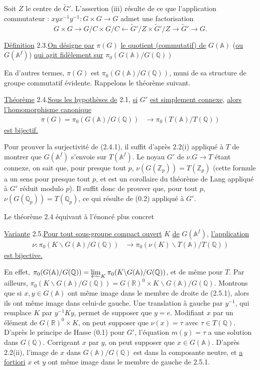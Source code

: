 \documentclass[10pt]{article}
\newcommand{\A}{\mathbb A}
\newcommand{\Af}{\mathbb A^f}
\newcommand{\Q}{\mathbb Q}
\newcommand{\R}{\mathbb R}
\newcommand{\Z}{\mathbb Z}
\newcommand{\limproj}{\varprojlim}
\begin{document}
Soit $Z$ le centre de $\widetilde G'$. L'assertion (iii) résulte de ce que l'application \textquotedbl{}commutateur\textquotedbl{} : $xyx^{-1}y^{-1}:G\times G\longrightarrow G$ admet une factorisation
\[
G\times G\longrightarrow G/C\times G/C\longleftarrow \widetilde G'/Z\times \widetilde G'/Z\longrightarrow \widetilde G'\longrightarrow G.
\]

\noindent\uline{Définition} 2.3.\quad \uline{On désigne par} $\pi(G)$ \uline{le quotient (commutatif) de} $G(\A)$ (\uline{ou} $G(\Af)$) \uline{qui agit fidèlement sur} $\pi_0(G(\A)/G(\Q))$

En d'autres termes, $\pi(G)$ est $\pi_0(G(\A)/G(\Q))$, muni de sa structure de groupe commutatif \textquotedbl{}évidente\textquotedbl{}. Rappelons le théorème suivant.

\noindent\uline{Théorème} 2.4.\quad \uline{Sous les hypothèses de} 2.1, \uline{si} $G'$ \uline{est simplement connexe}, \uline{alors} \uline{l'homomorphisme canonique}
\begingroup
\makeatletter
\tagsleft@true
\makeatother
\begin{align}
\pi(G)=\pi_0(G(\A)/G(\Q))&\longrightarrow \pi_0(T(\A)/T(\Q)) \tag{2.4.1}
\end{align}
\endgroup
\uline{est bijectif.}

Pour prouver la surjectivité de (2.4.1), il suffit d'après 2.2(i) appliqué à $T$ de montrer que $G(\Af)$ s'envoie sur $T(\Af)$. Le noyau $G'$ de $\nu.G\longrightarrow T$ étant connexe, on sait que, pour presque tout $p$, $\nu(G(\Z_p))=T(\Z_p)$ (cette formule a un sens pour presque tout $p$, et est un corollaire du théorème de Lang appliqué à $G'$ réduit modulo $p$). Il suffit donc de prouver que, pour tout $p$, $\nu(G(\Q_p))=T(\Q_p)$, ce qui résulte de (0.2) appliqué à $G'$.

Le théorème 2.4 équivaut à l'énoncé plus concret

\noindent\uline{Variante} 2.5.\quad \uline{Pour tout sous-groupe compact ouvert} $K$ \uline{de} $G(\Af)$, \uline{l'application}
\begingroup
\makeatletter
\tagsleft@true
\makeatother
\begin{align}
\nu:\pi_0(K\backslash G(\A)/G(\Q))&\longrightarrow\pi_0(\nu(K)\backslash T(\A)/T(\Q)) \tag{2.5.1}
\end{align}
\endgroup
\uline{est bijective.}

En effet, $\pi_0(G(\A)/G(\Q))=\limproj_K\pi_0(K\backslash G(\A)/G(\Q))$, et de même pour $T$. Par ailleurs, $\pi_0(K\backslash G(\A)/G(\Q))=G(\R)^0\times K\backslash G(\A)/G(\Q)$. Montrons que si $x,y\in G(\A)$ ont même image dans le membre de droite de (2.5.1), alors ils ont même image dans celui-de gauche. Une translation à gauche par $y^{-1}$, qui remplace $K$ par $y^{-1}Ky$, permet de supposer que $y=e$. Modifiant $x$ par un élément de $G(\R)^0\times K$, on peut supposer que $\nu(x)=\tau$ avec $\tau\in T(\Q)$. D'après le principe de Hasse (0.1) pour $G'$, l'équation $m(y)=\tau$ a une solution dans $G(\Q)$. Corrigeant $x$ par $y$, on peut supposer que $x\in G(\A)$. D'après 2.2(ii), l'image de $x$ dans $G(\A)/G(\Q)$ est dans la composante neutre, et \uline{a fortiori} $x$ et $y$ ont même image dans le membre de gauche de 2.5.1.
\end{document}
